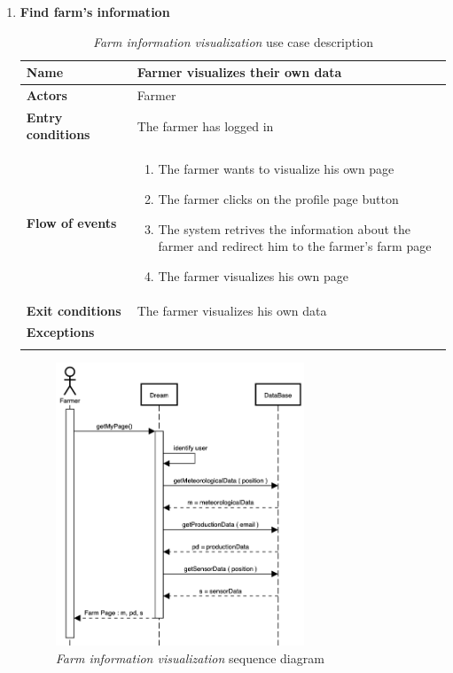 \begin{enumerate}
    \item \textbf{Find farm’s information}
    \begin{longtable}{p{0.26\linewidth}p{0.75\linewidth}}
        \toprule
        \textbf{Name} & \textbf{Farmer visualizes their own data} \\
        \midrule
        \textbf{Actors} & Farmer \\
        \midrule
        \textbf{Entry conditions} & The farmer has logged in\\
        \midrule
        \textbf{Flow of events} & 
        \begin{enumerate}
            \item The farmer wants to visualize his own page
            \item The farmer clicks on the profile page button
            \item The system retrives the information about the farmer and redirect him to the farmer's farm page
            \item The farmer visualizes his own page
        \end{enumerate} \\
        \midrule
        \textbf{Exit conditions} & The farmer visualizes his own data\\
        \midrule
        \textbf{Exceptions} & \\
        \bottomrule
        \caption{\emph{Farm information visualization} use case description}
    \end{longtable}

    \begin{figure}[H]
        \begin{center}
        \includegraphics[width=0.7\textwidth]{sequence/FarmInformation.png}
        \caption{\emph{Farm information visualization} sequence diagram}
        \label{fig:sequence6}
        \end{center}
    \end{figure}


\end{enumerate}
